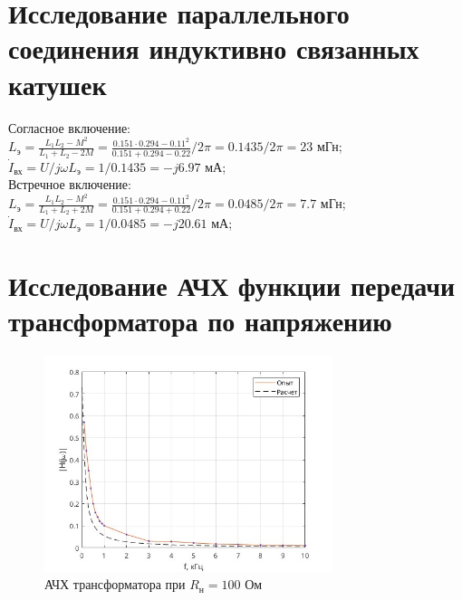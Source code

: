 \documentclass[a4paper,14pt ]{article} %
\begin{document}
    \section{Исследование параллельного соединения
индуктивно связанных катушек}
    \indent Согласное включение:\\
    $L_{\text{э}} = \frac{L_1L_2 - M^2}{L_1 + L_2 - 2M} = \frac{0.151 \cdot 0.294 - 0.11^2}{0.151 + 0.294 - 0.22}/2\pi=0.1435/2\pi=23$ мГн;\\
    $\dot{I}_{\text{вх}} = U/j\omega L_{\text{э}} = 1/0.1435 =  -j6.97$ мА; \\
    \indent Встречное включение:\\
    $L_{\text{э}} = \frac{L_1L_2 - M^2}{L_1 + L_2 + 2M} = \frac{0.151 \cdot 0.294 - 0.11^2}{0.151 + 0.294 + 0.22}/2\pi=0.0485/2\pi=7.7$ мГн;\\
    $\dot{I}_{\text{вх}} = U/j\omega L_{\text{э}} = 1/0.0485 =  -j20.61$ мА; \\
\section{Исследование АЧХ функции передачи трансформатора
по напряжению}
    \begin{figure}[H]
        \centering
        \includegraphics[width=0.75\textwidth]{R_100}
        \caption{АЧХ трансформатора при $R_{\text{н}} = 100$ Ом}
        \label{fig:1}
    \end{figure}
\end{document}
